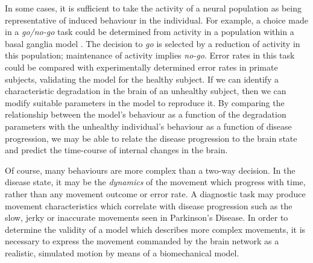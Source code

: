 \documentclass[11pt, a4paper]{article}
\newcommand{\e}{\emph}
\newcommand{\mycite}[1]{\cite{#1}}
\begin{document}
In some cases, it is sufficient to take the activity of a neural
population as being representative of induced behaviour in the
individual. For example, a choice made in a \e{go/no-go} task could be
determined from activity in a population within a basal ganglia model
\mycite{nambu_discharge_1990,kuhn_event-related_2004}. The decision
to \e{go} is selected by a reduction of activity in this population;
maintenance of activity implies \e{no-go}. Error rates in this task
could be compared with experimentally determined error rates in
primate subjects, validating the model for the healthy subject.
If we can identify a characteristic degradation in the brain of an
unhealthy subject, then we can modify suitable parameters in the model
to reproduce it. By comparing the relationship between the model's
behaviour as a function of the degradation parameters with the
unhealthy individual's behaviour as a function of disease progression,
we may be able to relate the disease progression to the brain state
and predict the time-course of internal changes in the brain.

Of course, many behaviours are more complex than a two-way
decision. In the disease state, it may be the \e{dynamics} of the
movement which progress with time, rather than any movement outcome or
error rate. A diagnostic task may produce movement characteristics
which correlate with disease progression such as the slow, jerky or
inaccurate movements seen in Parkinson's Disease. In order to
determine the validity of a model which describes more complex
movements, it is necessary to express the movement commanded by the
brain network as a realistic, simulated motion by means of a
biomechanical model.
\end{document}
